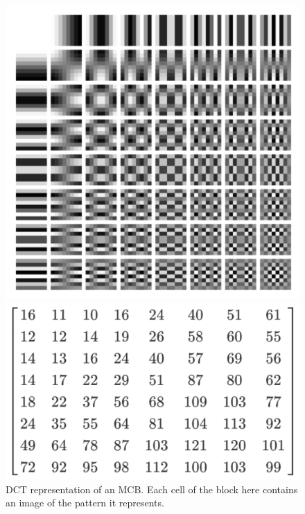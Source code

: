 \begin{figure}[ht]
\centering
    \begin{minipage}[b]{0.4\linewidth}
    \centering
    \includegraphics[width=\textwidth]{Pictures/DCT.png}
    \caption{DCT representation of an MCB. Each cell of the block here contains an image of the pattern it represents.}
    \label{fig:DCT}
    \end{minipage}
\hspace{0.05\linewidth}
    \begin{minipage}[b]{0.25\linewidth}
    \centering
    \includegraphics[width=\textwidth]{Pictures/quantization_table.png}

\end{minipage}
\end{figure}
